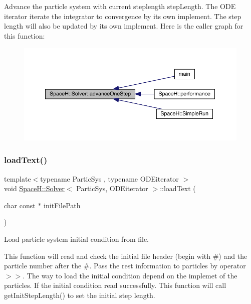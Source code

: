 Advance the particle system with current steplength step\+Length. The O\+DE iterator iterate the integrator to convergence by its own implement. The step length will also be updated by its own implement. Here is the caller graph for this function\+:
\nopagebreak
\begin{figure}[H]
\begin{center}
\leavevmode
\includegraphics[width=350pt]{class_space_h_1_1_solver_a28a4fd8cbf6df0d2bd1e3d376275f57e_icgraph}
\end{center}
\end{figure}
\mbox{\label{class_space_h_1_1_solver_aca3536accc3ff7f048f546992984d92a}} 
\subsubsection{\texorpdfstring{load\+Text()}{loadText()}}
{\footnotesize\ttfamily template$<$typename Partic\+Sys , typename O\+D\+Eiterator $>$ \\
void \mbox{\hyperlink{class_space_h_1_1_solver}{Space\+H\+::\+Solver}}$<$ Partic\+Sys, O\+D\+Eiterator $>$\+::load\+Text (\begin{DoxyParamCaption}\item[{char const $\ast$}]{init\+File\+Path }\end{DoxyParamCaption})}



Load particle system initial condition from file. 

This function will read and check the initial file header (begin with \textquotesingle{}\#\textquotesingle{}) and the particle number after the \textquotesingle{}\#\textquotesingle{}. Pass the rest information to particles by operator \textquotesingle{}$>$$>$\textquotesingle{}. The way to load the initial condition depend on the implemet of the particles. If the initial condition read successfully. This function will call get\+Init\+Step\+Length() to set the initial step length.


